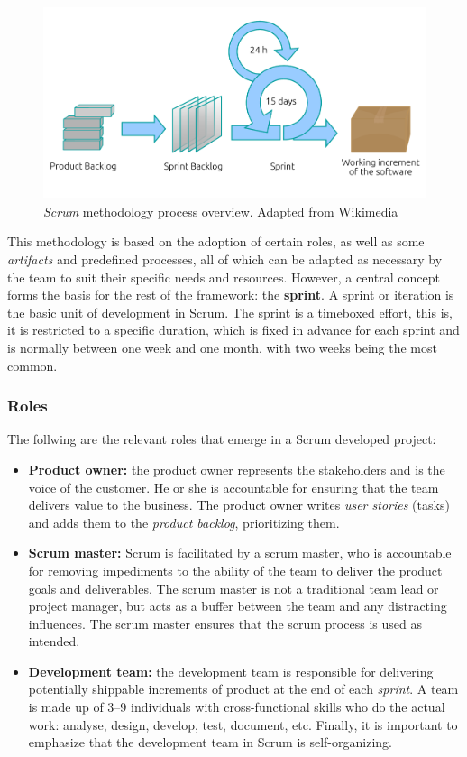 \begin{figure}
	\centering
	\includegraphics[width=0.8\linewidth]{figures/scrum.pdf}
	\caption[Scrum methodology workflow.]{\textit{Scrum} methodology process overview. Adapted from Wikimedia~\citep{web:Wiki:ScrumProcess}}
	\label{fig:scrum}
\end{figure}

This methodology is based on the adoption of certain roles, as well as some \textit{artifacts} and predefined processes, all of which can be adapted as necessary by the team to suit their specific needs and resources. However, a central concept forms the basis for the rest of the framework: the \textbf{sprint}. A sprint or iteration is the basic unit of development in Scrum. The sprint is a timeboxed effort, this is, it is restricted to a specific duration, which is fixed in advance for each sprint and is normally between one week and one month, with two weeks being the most common.

\subsubsection*{Roles}

The follwing are the relevant roles that emerge in a Scrum developed project:

\begin{itemize}
	\item
	\textbf{Product owner:} the product owner represents the stakeholders and is the voice of the customer. He or she is accountable for ensuring that the team delivers value to the business. The product owner writes \textit{user stories} (tasks) and adds them to the \textit{product backlog}, prioritizing them.
	
	\item
	\textbf{Scrum master:} Scrum is facilitated by a scrum master, who is accountable for removing impediments to the ability of the team to deliver the product goals and deliverables. The scrum master is not a traditional team lead or project manager, but acts as a buffer between the team and any distracting influences. The scrum master ensures that the scrum process is used as intended.
	
	\item
	\textbf{Development team:} the development team is responsible for delivering potentially shippable increments of product at the end of each \textit{sprint}. A team is made up of 3–9 individuals with cross-functional skills who do the actual work: analyse, design, develop, test, document, etc. Finally, it is important to emphasize that the development team in Scrum is self-organizing.
\end{itemize}

